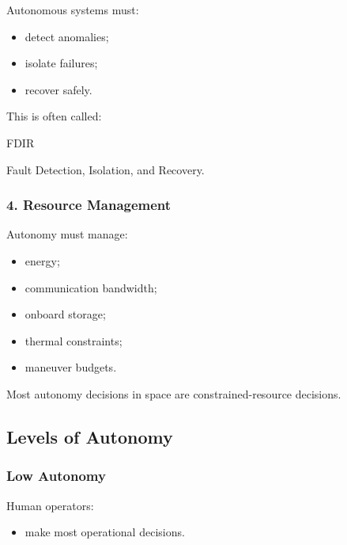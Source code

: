 \documentclass[10pt,a4paper,twocolumn]{article}
\begin{document}
Autonomous systems must:
\begin{itemize}
    \item detect anomalies;
    \item isolate failures;
    \item recover safely.
\end{itemize}

This is often called:
\begin{center}
    FDIR
\end{center}

Fault Detection, Isolation, and Recovery.


\subsubsection*{4. Resource Management}

Autonomy must manage:
\begin{itemize}
    \item energy;
    \item communication bandwidth;
    \item onboard storage;
    \item thermal constraints;
    \item maneuver budgets.
\end{itemize}

\begin{warningbox}
    Most autonomy decisions in space are constrained-resource decisions.
\end{warningbox}


\subsection{Levels of Autonomy}


\subsubsection*{Low Autonomy}

Human operators:
\begin{itemize}
    \item make most operational decisions.
\end{itemize}
\end{document}
